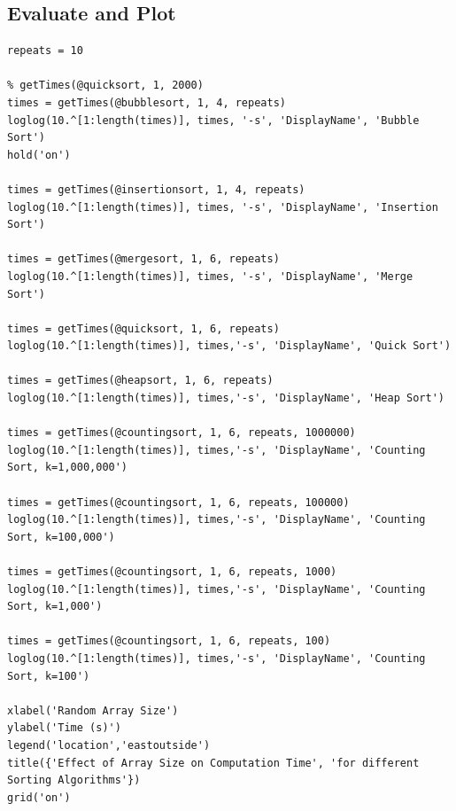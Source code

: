 \documentclass[a4paper]{article}
\begin{document}
\subsection{Evaluate and Plot}
\begin{lstlisting}
repeats = 10

% getTimes(@quicksort, 1, 2000)
times = getTimes(@bubblesort, 1, 4, repeats)
loglog(10.^[1:length(times)], times, '-s', 'DisplayName', 'Bubble Sort')
hold('on')

times = getTimes(@insertionsort, 1, 4, repeats)
loglog(10.^[1:length(times)], times, '-s', 'DisplayName', 'Insertion Sort')

times = getTimes(@mergesort, 1, 6, repeats)
loglog(10.^[1:length(times)], times, '-s', 'DisplayName', 'Merge Sort')

times = getTimes(@quicksort, 1, 6, repeats)
loglog(10.^[1:length(times)], times,'-s', 'DisplayName', 'Quick Sort')

times = getTimes(@heapsort, 1, 6, repeats)
loglog(10.^[1:length(times)], times,'-s', 'DisplayName', 'Heap Sort')

times = getTimes(@countingsort, 1, 6, repeats, 1000000)
loglog(10.^[1:length(times)], times,'-s', 'DisplayName', 'Counting Sort, k=1,000,000')

times = getTimes(@countingsort, 1, 6, repeats, 100000)
loglog(10.^[1:length(times)], times,'-s', 'DisplayName', 'Counting Sort, k=100,000')

times = getTimes(@countingsort, 1, 6, repeats, 1000)
loglog(10.^[1:length(times)], times,'-s', 'DisplayName', 'Counting Sort, k=1,000')

times = getTimes(@countingsort, 1, 6, repeats, 100)
loglog(10.^[1:length(times)], times,'-s', 'DisplayName', 'Counting Sort, k=100')

xlabel('Random Array Size')
ylabel('Time (s)')
legend('location','eastoutside')
title({'Effect of Array Size on Computation Time', 'for different Sorting Algorithms'})
grid('on')

\end{lstlisting}
\end{document}
